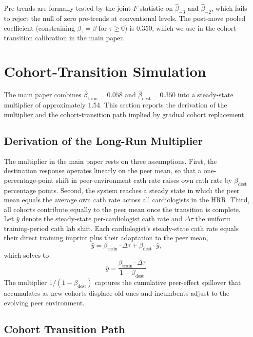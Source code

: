 \documentclass[12pt]{article}
\begin{document}
Pre-trends are formally tested by the joint $F$-statistic on $\hat\beta_{-3}$ and $\hat\beta_{-2}$, which fails to reject the null of zero pre-trends at conventional levels. The post-move pooled coefficient (constraining $\beta_\tau = \beta$ for $\tau \geq 0$) is 0.350, which we use in the cohort-transition calibration in the main paper.

\section{Cohort-Transition Simulation}\label{sec:app-var}

The main paper combines $\hat\beta_{\text{train}} = 0.058$ and $\hat\beta_{\text{dest}} = 0.350$ into a steady-state multiplier of approximately 1.54. This section reports the derivation of the multiplier and the cohort-transition path implied by gradual cohort replacement.

\subsection{Derivation of the Long-Run Multiplier}

The multiplier in the main paper rests on three assumptions. First, the destination response operates linearly on the peer mean, so that a one-percentage-point shift in peer-environment cath rate raises own cath rate by $\beta_{\text{dest}}$ percentage points. Second, the system reaches a steady state in which the peer mean equals the average own cath rate across all cardiologists in the HRR. Third, all cohorts contribute equally to the peer mean once the transition is complete. Let $\bar{y}$ denote the steady-state per-cardiologist cath rate and $\Delta\tau$ the uniform training-period cath lab shift. Each cardiologist's steady-state cath rate equals their direct training imprint plus their adaptation to the peer mean,
\begin{equation*}
\bar{y} = \beta_{\text{train}} \cdot \Delta\tau + \beta_{\text{dest}} \cdot \bar{y},
\end{equation*}
which solves to
\begin{equation*}
\bar{y} = \frac{\beta_{\text{train}} \cdot \Delta\tau}{1 - \beta_{\text{dest}}}.
\end{equation*}
The multiplier $1/(1 - \beta_{\text{dest}})$ captures the cumulative peer-effect spillover that accumulates as new cohorts displace old ones and incumbents adjust to the evolving peer environment.

\subsection{Cohort Transition Path}
\end{document}

